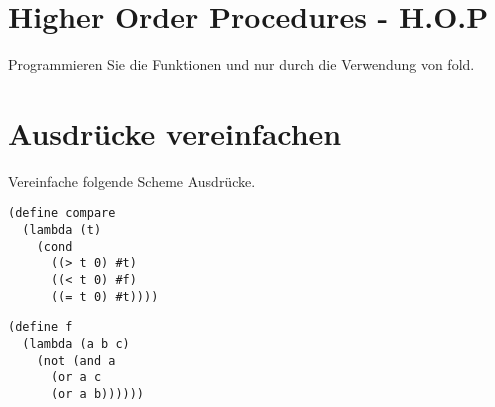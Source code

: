 \documentclass[11pt]{article}
\begin{document}
\section{Higher Order Procedures - H.O.P}

Programmieren Sie die Funktionen  und  nur durch die Verwendung von fold.

\section{Ausdrücke vereinfachen}

Vereinfache folgende Scheme Ausdrücke.

\ba
	\item \begin{lstlisting}
(define compare
  (lambda (t)
	(cond
	  ((> t 0) #t)
	  ((< t 0) #f)
	  ((= t 0) #t))))	
	\end{lstlisting}
	
	\item 
	
	\begin{lstlisting}
(define f
  (lambda (a b c)
    (not (and a 
	  (or a c
	  (or a b))))))
	\end{lstlisting}
\ea 
\end{document}
